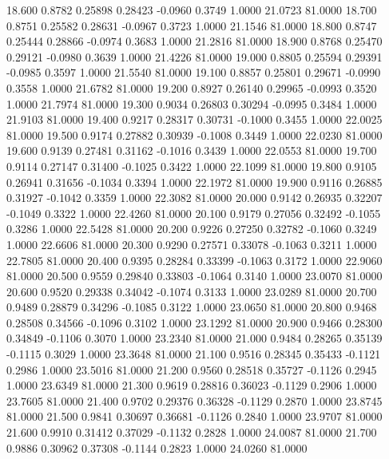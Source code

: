  18.600   0.8782   0.25898   0.28423  -0.0960   0.3749   1.0000  21.0723  81.0000
  18.700   0.8751   0.25582   0.28631  -0.0967   0.3723   1.0000  21.1546  81.0000
  18.800   0.8747   0.25444   0.28866  -0.0974   0.3683   1.0000  21.2816  81.0000
  18.900   0.8768   0.25470   0.29121  -0.0980   0.3639   1.0000  21.4226  81.0000
  19.000   0.8805   0.25594   0.29391  -0.0985   0.3597   1.0000  21.5540  81.0000
  19.100   0.8857   0.25801   0.29671  -0.0990   0.3558   1.0000  21.6782  81.0000
  19.200   0.8927   0.26140   0.29965  -0.0993   0.3520   1.0000  21.7974  81.0000
  19.300   0.9034   0.26803   0.30294  -0.0995   0.3484   1.0000  21.9103  81.0000
  19.400   0.9217   0.28317   0.30731  -0.1000   0.3455   1.0000  22.0025  81.0000
  19.500   0.9174   0.27882   0.30939  -0.1008   0.3449   1.0000  22.0230  81.0000
  19.600   0.9139   0.27481   0.31162  -0.1016   0.3439   1.0000  22.0553  81.0000
  19.700   0.9114   0.27147   0.31400  -0.1025   0.3422   1.0000  22.1099  81.0000
  19.800   0.9105   0.26941   0.31656  -0.1034   0.3394   1.0000  22.1972  81.0000
  19.900   0.9116   0.26885   0.31927  -0.1042   0.3359   1.0000  22.3082  81.0000
  20.000   0.9142   0.26935   0.32207  -0.1049   0.3322   1.0000  22.4260  81.0000
  20.100   0.9179   0.27056   0.32492  -0.1055   0.3286   1.0000  22.5428  81.0000
  20.200   0.9226   0.27250   0.32782  -0.1060   0.3249   1.0000  22.6606  81.0000
  20.300   0.9290   0.27571   0.33078  -0.1063   0.3211   1.0000  22.7805  81.0000
  20.400   0.9395   0.28284   0.33399  -0.1063   0.3172   1.0000  22.9060  81.0000
  20.500   0.9559   0.29840   0.33803  -0.1064   0.3140   1.0000  23.0070  81.0000
  20.600   0.9520   0.29338   0.34042  -0.1074   0.3133   1.0000  23.0289  81.0000
  20.700   0.9489   0.28879   0.34296  -0.1085   0.3122   1.0000  23.0650  81.0000
  20.800   0.9468   0.28508   0.34566  -0.1096   0.3102   1.0000  23.1292  81.0000
  20.900   0.9466   0.28300   0.34849  -0.1106   0.3070   1.0000  23.2340  81.0000
  21.000   0.9484   0.28265   0.35139  -0.1115   0.3029   1.0000  23.3648  81.0000
  21.100   0.9516   0.28345   0.35433  -0.1121   0.2986   1.0000  23.5016  81.0000
  21.200   0.9560   0.28518   0.35727  -0.1126   0.2945   1.0000  23.6349  81.0000
  21.300   0.9619   0.28816   0.36023  -0.1129   0.2906   1.0000  23.7605  81.0000
  21.400   0.9702   0.29376   0.36328  -0.1129   0.2870   1.0000  23.8745  81.0000
  21.500   0.9841   0.30697   0.36681  -0.1126   0.2840   1.0000  23.9707  81.0000
  21.600   0.9910   0.31412   0.37029  -0.1132   0.2828   1.0000  24.0087  81.0000
  21.700   0.9886   0.30962   0.37308  -0.1144   0.2823   1.0000  24.0260  81.0000
